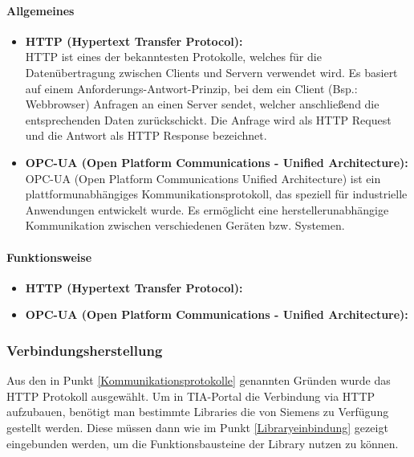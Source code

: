         \paragraph{Allgemeines}

        \begin{itemize}
            \item \textbf{HTTP (Hypertext Transfer Protocol):}  \mbox{} \\
            HTTP ist eines der bekanntesten Protokolle, welches für die Datenübertragung zwischen Clients und Servern verwendet wird. Es basiert auf einem Anforderungs-Antwort-Prinzip, bei dem ein Client (Bsp.: Webbrowser) Anfragen an einen Server sendet, welcher anschließend die entsprechenden Daten zurückschickt. Die Anfrage wird als HTTP Request und die Antwort als HTTP Response bezeichnet.\cite{HTTP-Allgemein}
            
            \item \textbf{OPC-UA (Open Platform Communications - Unified Architecture):} \mbox{} \\
            OPC-UA (Open Platform Communications Unified Architecture) ist ein plattformunabhängiges Kommunikationsprotokoll, das speziell für industrielle Anwendungen entwickelt wurde. Es ermöglicht eine herstellerunabhängige Kommunikation zwischen verschiedenen Geräten bzw. Systemen. \cite{OPC-UA}
        \end{itemize}

        \paragraph{Funktionsweise}

            \begin{itemize}
                \item \textbf{{HTTP (Hypertext Transfer Protocol):}} \mbox{} \\
                
            
                \item \textbf{{OPC-UA (Open Platform Communications - Unified Architecture):}} \mbox{} \\
                
            \end{itemize}
        
            

    
    \subsubsection{Verbindungsherstellung}
    Aus den in Punkt \ref{Kommunikationsprotokolle} genannten Gründen wurde das HTTP Protokoll ausgewählt. Um in TIA-Portal die Verbindung via HTTP aufzubauen, benötigt man bestimmte Libraries die von Siemens zu Verfügung gestellt werden. Diese müssen dann wie im Punkt \ref{Libraryeinbindung} gezeigt eingebunden werden, um die Funktionsbausteine der Library nutzen zu können. 

